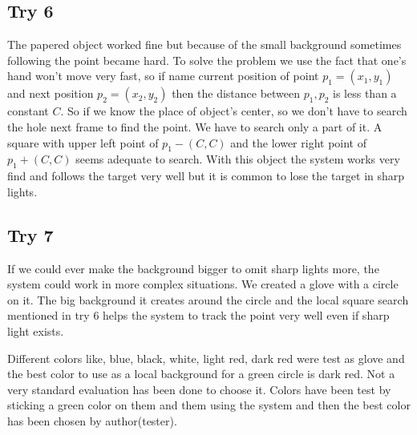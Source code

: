 \subsection{Try 6}
The papered object worked fine but because of the small background sometimes following the point became hard. To solve the problem we use the fact that one's hand won't move very fast, so if name current position of point $p_1 = (x_1, y_1)$ and next position $p_2 = (x_2, y_2)$ then the distance between $p_1, p_2$ is less than a constant $C$. So if we know the place of object's center, so we don't have to search the hole next frame to find the point. We have to search only a part of it. A square with upper left point of $p_1 - (C, C)$ and the lower right point of $p_1 + (C, C)$ seems adequate to search. With this object the system works very find and follows the target very well but it is common to lose the target in sharp lights.
\subsection{Try 7}
If we could ever make the background bigger to omit sharp lights more, the system could work in more complex situations. We created a glove with a circle on it. The big background it creates around the circle and the local square search mentioned in try 6 helps the system to track the point very well even if sharp light exists. 

 Different colors like, blue, black, white, light red, dark red were test as glove and the best color to use as a local background for a green circle is dark red. Not a very standard evaluation has been done to choose it. Colors have been test by sticking a green color on them and them using the system and then the best color has been chosen by author(tester). 

